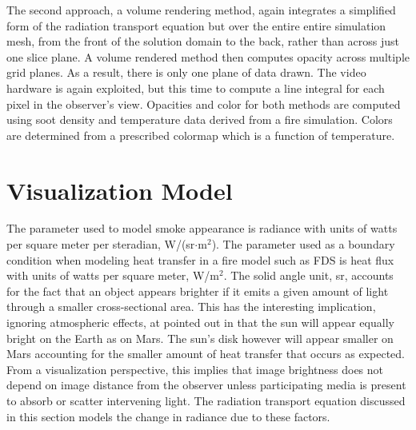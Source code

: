 The second approach, a volume rendering method, again integrates a
simplified form of the radiation transport equation but over the entire entire simulation mesh,
from the
front of the solution domain to the back, rather than across just
one slice plane. A volume rendered method then computes opacity across multiple grid planes.
As a result, there is only one plane of data drawn.  The video hardware is again exploited, but this time to
compute a line integral for each pixel in the observer's view.  Opacities and
color for both methods are computed using soot density and
temperature data derived from a fire simulation. Colors are
determined from a prescribed colormap which is a function of
temperature.






%
%

\section{Visualization Model}
The parameter used to model smoke appearance is radiance with units of watts per square meter per steradian, W/(sr$\cdot$m$^2$).  The parameter used as a boundary condition when modeling heat transfer in a fire model such as FDS is heat flux with units of watts per square meter, W/m$^2$. The solid angle unit, sr, accounts for the fact that an object appears brighter if it emits a given amount of light through a smaller cross-sectional area. This has the interesting implication, ignoring atmospheric effects, at pointed out in \cite{} that the sun will appear equally bright on the Earth as on Mars.  The sun's disk however will appear smaller on Mars accounting for the smaller amount of heat transfer that occurs as expected.  From a visualization perspective, this implies that image brightness does not depend on image distance from the observer unless  participating media is present to absorb or scatter  intervening light.  The radiation transport equation discussed in this section models the change in radiance due to these factors.

